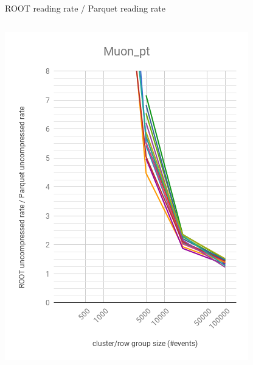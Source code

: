 \documentclass[aspectratio=169]{beamer}
\begin{document}
\begin{frame}{ROOT reading rate / Parquet reading rate}
\vspace{-0.15 cm}

\begin{columns}
\begin{center}
\includegraphics[width=\linewidth]{root-none-parquet-none-Muon_pt.png}
\end{center}
\begin{center}

\end{center}
\end{columns}
\end{frame}
\end{document}
